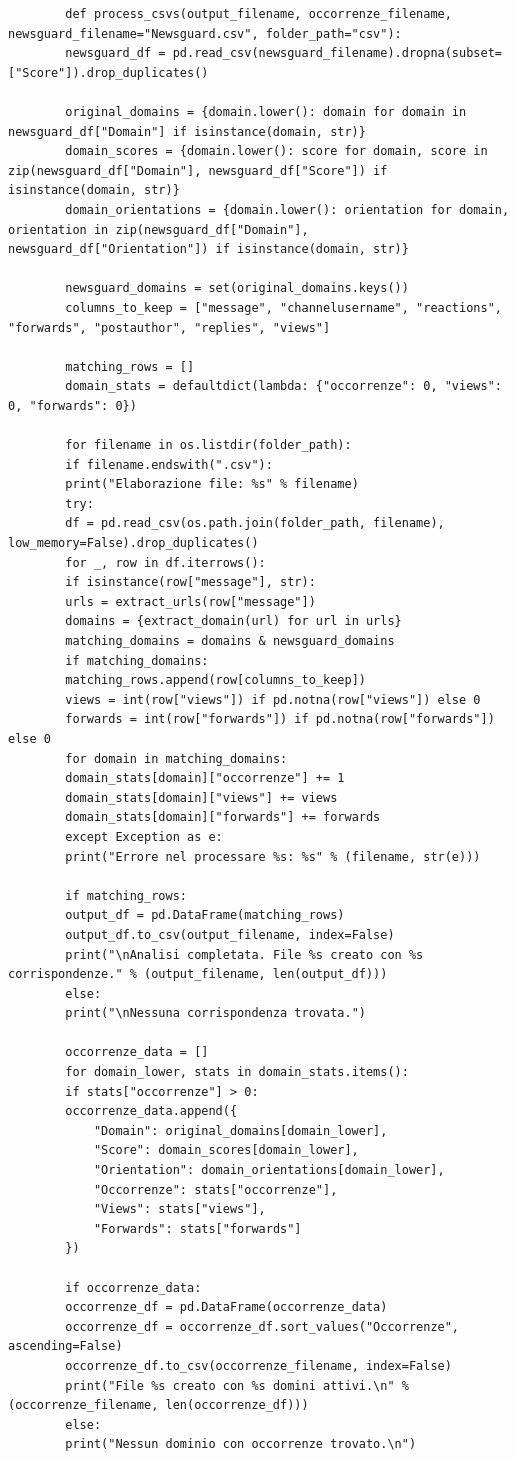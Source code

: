 \documentclass[12pt]{article}
\begin{document}
	\begin{lstlisting}
		def process_csvs(output_filename, occorrenze_filename, newsguard_filename="Newsguard.csv", folder_path="csv"):
		newsguard_df = pd.read_csv(newsguard_filename).dropna(subset=["Score"]).drop_duplicates()
		
		original_domains = {domain.lower(): domain for domain in newsguard_df["Domain"] if isinstance(domain, str)}
		domain_scores = {domain.lower(): score for domain, score in zip(newsguard_df["Domain"], newsguard_df["Score"]) if isinstance(domain, str)}
		domain_orientations = {domain.lower(): orientation for domain, orientation in zip(newsguard_df["Domain"], newsguard_df["Orientation"]) if isinstance(domain, str)}
		
		newsguard_domains = set(original_domains.keys())
		columns_to_keep = ["message", "channelusername", "reactions", "forwards", "postauthor", "replies", "views"]
		
		matching_rows = []
		domain_stats = defaultdict(lambda: {"occorrenze": 0, "views": 0, "forwards": 0})
		
		for filename in os.listdir(folder_path):
		if filename.endswith(".csv"):
		print("Elaborazione file: %s" % filename)
		try:
		df = pd.read_csv(os.path.join(folder_path, filename), low_memory=False).drop_duplicates()
		for _, row in df.iterrows():
		if isinstance(row["message"], str):
		urls = extract_urls(row["message"])
		domains = {extract_domain(url) for url in urls}
		matching_domains = domains & newsguard_domains
		if matching_domains:
		matching_rows.append(row[columns_to_keep])
		views = int(row["views"]) if pd.notna(row["views"]) else 0
		forwards = int(row["forwards"]) if pd.notna(row["forwards"]) else 0
		for domain in matching_domains:
		domain_stats[domain]["occorrenze"] += 1
		domain_stats[domain]["views"] += views
		domain_stats[domain]["forwards"] += forwards
		except Exception as e:
		print("Errore nel processare %s: %s" % (filename, str(e)))
		
		if matching_rows:
		output_df = pd.DataFrame(matching_rows)
		output_df.to_csv(output_filename, index=False)
		print("\nAnalisi completata. File %s creato con %s corrispondenze." % (output_filename, len(output_df)))
		else:
		print("\nNessuna corrispondenza trovata.")
		
		occorrenze_data = []
		for domain_lower, stats in domain_stats.items():
		if stats["occorrenze"] > 0:
		occorrenze_data.append({
			"Domain": original_domains[domain_lower],
			"Score": domain_scores[domain_lower],
			"Orientation": domain_orientations[domain_lower],
			"Occorrenze": stats["occorrenze"],
			"Views": stats["views"],
			"Forwards": stats["forwards"]
		})
		
		if occorrenze_data:
		occorrenze_df = pd.DataFrame(occorrenze_data)
		occorrenze_df = occorrenze_df.sort_values("Occorrenze", ascending=False)
		occorrenze_df.to_csv(occorrenze_filename, index=False)
		print("File %s creato con %s domini attivi.\n" % (occorrenze_filename, len(occorrenze_df)))
		else:
		print("Nessun dominio con occorrenze trovato.\n")
	\end{lstlisting}
\end{document}
